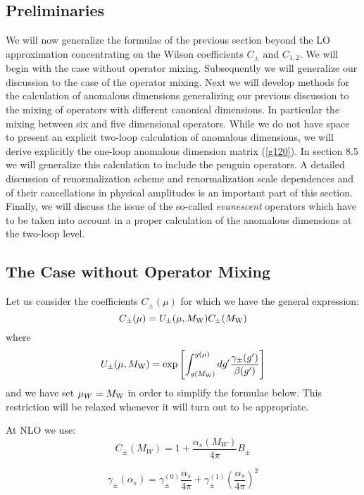 \documentclass[12pt]{article}
\def\as{\alpha_s}
\newcommand{\mw}{M_{\rm W}}
\def\aspi{\frac{\as}{4\pi}}
\begin{document}
\begin{itemize}
\begin{itemize}
\begin{itemize}
\subsection{Preliminaries}
We will now generalize the formulae of the previous section beyond
the LO approximation concentrating on the Wilson coefficients $C_{\pm}$
and $C_{1,2}$. We will begin with the case without operator mixing.
Subsequently we will generalize our discussion 
 to the case of the operator mixing. Next we will
develop methods for the calculation of anomalous dimensions
generalizing our previous discussion 
to the mixing of operators with different canonical
dimensions. In particular the mixing between six and five dimensional
operators.
While we do not have space to present an explicit two-loop calculation
of anomalous dimensions, we will derive explicitly the one-loop anomalous
dimension matrix (\ref{g120}). In section 8.5 we will generalize this
calculation to include the penguin operators.
A detailed discussion of renormalization scheme
and renormalization scale dependences and of their cancellations in
physical amplitudes is an important part of this section. Finally,
we will discuss the issue of the so-called {\it evanescent}
operators which have to be taken into account in a proper calculation
of the anomalous dimensions at the two-loop level. 
\subsection{The Case without Operator Mixing}
Let us consider the coefficients $C_\pm(\mu)$
for which we have the general expression:
\begin{equation}\label{C1+-}
 C_\pm(\mu) = U_\pm(\mu,\mw) C_\pm(\mw) 
  \end{equation}
where 
\begin{equation}\label{U1+-}
U_\pm(\mu,\mw)= \exp \left[ 
  \int_{g(\mw)}^{g(\mu)}{dg' \frac{\gamma_\pm(g')}{\beta(g')}}\right] 
\end{equation}
and we have set $\mu_W=\mw$ in order to simplify the formulae below.
This restriction will be relaxed whenever it will turn out to be 
appropriate.

At NLO we use:
\begin{equation}\label{B8}
C_\pm(M_W)=1+\frac{\as(M_W)}{4\pi}B_\pm
\end{equation}

\begin{equation}\label{gg01P}
\gamma_\pm(\as)=\gamma_\pm^{(0)}\aspi + \gamma_\pm^{(1)}\left(\aspi\right)^2
\end{equation}


\end{itemize}
\end{itemize}
\end{itemize}
\end{document}
